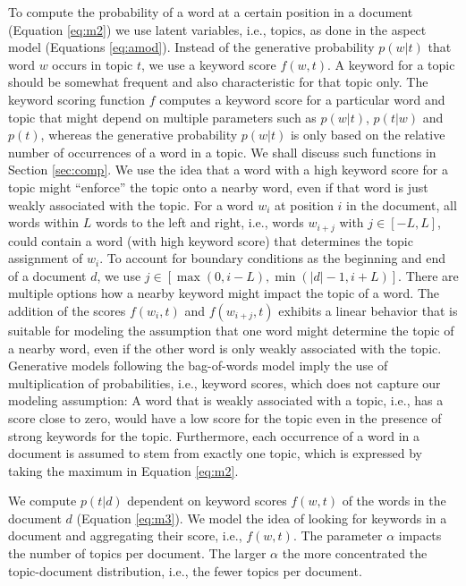 \documentclass[twocolumn,10]{article}
\begin{document}
	To compute the probability of a word at a certain position in a document (Equation \ref{eq:m2}) we use latent variables, i.e., topics, as done in the aspect model (Equations \ref{eq:amod}). Instead of the generative probability $p(w|t)$ that word $w$ occurs in topic $t$, we use a keyword score $f(w,t)$. A keyword for a topic should be somewhat frequent and also characteristic for that topic only. The keyword scoring function $f$ computes a keyword score for a particular word and topic that might depend on multiple parameters such as $p(w|t)$, $p(t|w)$ and $p(t)$, whereas the generative probability $p(w|t)$ is only based on the relative number of occurrences of a word in a topic. We shall discuss such functions in Section \ref{sec:comp}. We use the idea that a word with a high keyword score for a topic might ``enforce'' the topic onto a nearby word, even if that word is just weakly associated with the topic. For a word $w_i$ at position $i$ in the document, all words within $L$ words to the left and right, i.e., words $w_{i+j}$ with $j \in [-L,L]$, could contain a word (with high keyword score) that determines the topic assignment of $w_i$. To account for boundary conditions as the beginning and end of a document $d$, we use $j \in [\max(0,i-L),\min(|d|-1,i+L)]$. There are multiple options how a nearby keyword might impact the topic of a word. The addition of the scores $f(w_i,t)$ and $f(w_{i+j},t)$ exhibits a linear behavior that is suitable for modeling the assumption that one word might determine the topic of a nearby word, even if the other word is only weakly associated with the topic. Generative models following the bag-of-words model imply the use of multiplication of probabilities, i.e., keyword scores, which does not capture our modeling assumption: A word that is weakly associated with a topic, i.e., has a score close to zero, would have a low score for the topic even in the presence of strong keywords for the topic. Furthermore, each occurrence of a word in a document is assumed to stem from exactly one topic, which is expressed by taking the maximum in Equation \ref{eq:m2}.%
	
	We compute $p(t|d)$ dependent on keyword scores $f(w,t)$ of the words in the document $d$ (Equation \ref{eq:m3}).  We model the idea of looking for keywords in a document and aggregating their score, i.e., $f(w,t)$. The parameter $\alpha$ impacts the number of topics per document. The larger $\alpha$ the more concentrated the topic-document distribution, i.e., the fewer topics per document.
	
\end{document}
